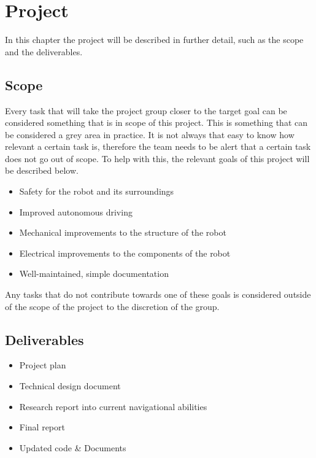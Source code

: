 \section{Project}
In this chapter the project will be described in further detail, such as the scope and the deliverables.
\subsection{Scope}
Every task that will take the project group closer to the target goal can be considered something that is in scope of this project. 
This is something that can be considered a grey area in practice. 
It is not always that easy to know how relevant a certain task is, therefore the team needs to be alert that a certain task does not go out of scope. 
To help with this, the relevant goals of this project will be described below. 
\begin{itemize}
\item Safety for the robot and its surroundings
\item Improved autonomous driving
\item Mechanical improvements to the structure of the robot
\item Electrical improvements to the components of the robot
\item Well-maintained, simple documentation
\end{itemize}
Any tasks that do not contribute towards one of these goals is considered outside of the scope of the project to the discretion of the group.

\subsection{Deliverables}
\begin{itemize}
\item Project plan
\item Technical design document
\item Research report into current navigational abilities
\item Final report
\item Updated code \& Documents 
\end{itemize}

\newpage
